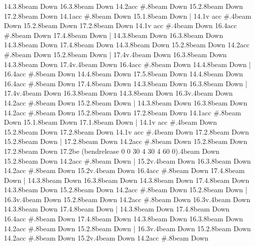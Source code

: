       14.3.8{beam Down}
      16.3.8{beam Down}
      14.2{acc #}.8{beam Down}
      15.2.8{beam Down}
      17.2.8{beam Down}
      14.1{acc #}.8{beam Down}
      15.1.8{beam Down}
    |
      14.1{v acc #}.4{beam Down}
      15.2.8{beam Down}
      17.2.8{beam Down}
      14.1{v acc #}.4{beam Down}
      16.4{acc #}.8{beam Down}
      17.4.8{beam Down}
    |
      14.3.8{beam Down}
      16.3.8{beam Down}
      14.3.8{beam Down}
      17.4.8{beam Down}
      14.3.8{beam Down}
      15.2.8{beam Down}
      14.2{acc #}.8{beam Down}
      15.2.8{beam Down}
    |
      17.4{v}.4{beam Down}
      16.3.8{beam Down}
      14.3.8{beam Down}
      17.4{v}.4{beam Down}
      16.4{acc #}.8{beam Down}
      14.4.8{beam Down}
    |
      16.4{acc #}.8{beam Down}
      14.4.8{beam Down}
      17.5.8{beam Down}
      14.4.8{beam Down}
      16.4{acc #}.8{beam Down}
      17.4.8{beam Down}
      14.3.8{beam Down}
      16.3.8{beam Down}
    |
      17.4{v}.4{beam Down}
      16.3.8{beam Down}
      14.3.8{beam Down}
      16.3{v}.4{beam Down}
      14.2{acc #}.8{beam Down}
      15.2.8{beam Down}
    |
      14.3.8{beam Down}
      16.3.8{beam Down}
      14.2{acc #}.8{beam Down}
      15.2.8{beam Down}
      17.2.8{beam Down}
      14.1{acc #}.8{beam Down}
      15.1.8{beam Down}
      17.1.8{beam Down}
    |
      14.1{v acc #}.4{beam Down}
      15.2.8{beam Down}
      17.2.8{beam Down}
      14.1{v acc #}.4{beam Down}
      17.2.8{beam Down}
      15.2.8{beam Down}
    |
      17.2.8{beam Down}
      14.2{acc #}.8{beam Down}
      15.2.8{beam Down}
      17.2.8{beam Down}
      17.2{be (bendrelease 0 0 30 4 30 4 60 0)}.4{beam Down}
      15.2.8{beam Down}
      14.2{acc #}.8{beam Down}
    |
      15.2{v}.4{beam Down}
      16.3.8{beam Down}
      14.2{acc #}.8{beam Down}
      15.2{v}.4{beam Down}
      16.4{acc #}.8{beam Down}
      17.4.8{beam Down}
    |
      14.3.8{beam Down}
      16.3.8{beam Down}
      14.3.8{beam Down}
      17.4.8{beam Down}
      14.3.8{beam Down}
      15.2.8{beam Down}
      14.2{acc #}.8{beam Down}
      15.2.8{beam Down}
    |
      16.3{v}.4{beam Down}
      15.2.8{beam Down}
      14.2{acc #}.8{beam Down}
      16.3{v}.4{beam Down}
      14.3.8{beam Down}
      17.4.8{beam Down}
    |
      14.3.8{beam Down}
      17.4.8{beam Down}
      16.4{acc #}.8{beam Down}
      17.4.8{beam Down}
      14.3.8{beam Down}
      16.3.8{beam Down}
      14.2{acc #}.8{beam Down}
      15.2.8{beam Down}
    |
      16.3{v}.4{beam Down}
      15.2.8{beam Down}
      14.2{acc #}.8{beam Down}
      15.2{v}.4{beam Down}
      14.2{acc #}.8{beam Down}
